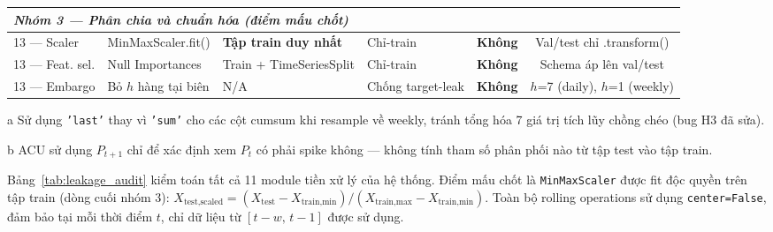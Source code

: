 \begin{table}[htbp]
\begin{threeparttable}
\begin{tabular}{@{}llllcc@{}}
\midrule
\multicolumn{6}{l}{\textit{Nhóm 3 — Phân chia và chuẩn hóa (điểm mấu chốt)}} \\
\midrule
13 --- Scaler    & MinMaxScaler.fit()      & \textbf{Tập train duy nhất}   & Chỉ-train  & \textbf{Không} & Val/test chỉ .transform() \\
13 --- Feat. sel.& Null Importances        & Train + TimeSeriesSplit& Chỉ-train  & \textbf{Không} & Schema áp lên val/test \\
13 --- Embargo   & Bỏ $h$ hàng tại biên   & N/A                   & Chống target-leak & \textbf{Không} & $h$=7 (daily), $h$=1 (weekly) \\
\bottomrule
\end{tabular}
\begin{tablenotes}
\footnotesize
\item[a] Sử dụng \texttt{'last'} thay vì \texttt{'sum'} cho các cột cumsum khi resample về weekly, tránh tổng hóa 7 giá trị tích lũy chồng chéo (bug H3 đã sửa).
\item[b] ACU sử dụng $P_{t+1}$ chỉ để xác định xem $P_t$ có phải spike không — không tính tham số phân phối nào từ tập test vào tập train.
\end{tablenotes}
\end{threeparttable}
\end{table}

Bảng~\ref{tab:leakage_audit} kiểm toán tất cả 11 module tiền xử lý của hệ thống.
Điểm mấu chốt là \texttt{MinMaxScaler} được fit độc quyền trên tập train (dòng cuối nhóm 3):
$X_\text{test,scaled} = (X_\text{test} - X_\text{train,min}) / (X_\text{train,max} - X_\text{train,min})$.
Toàn bộ rolling operations sử dụng \texttt{center=False}, đảm bảo tại mỗi thời điểm $t$,
chỉ dữ liệu từ $[t{-}w,\, t{-}1]$ được sử dụng.



